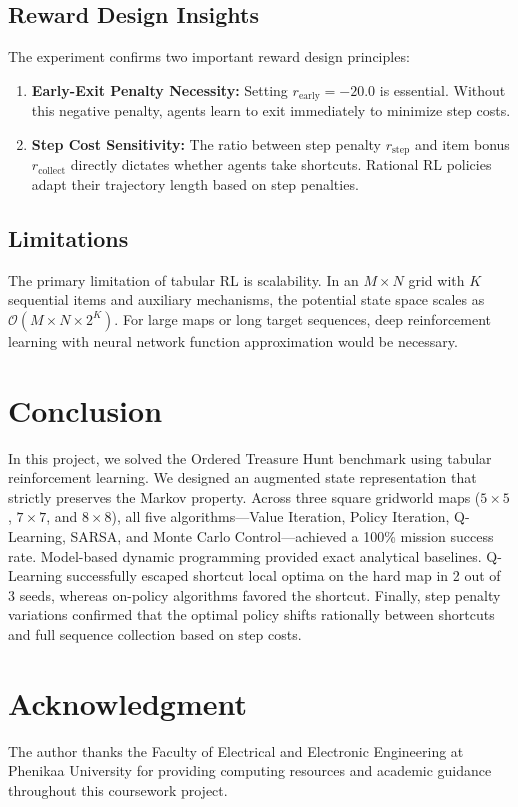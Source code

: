 \documentclass[10pt,conference]{IEEEtran}
\begin{document}
\subsection{Reward Design Insights}
The experiment confirms two important reward design principles:
\begin{enumerate}
    \item \textbf{Early-Exit Penalty Necessity:} Setting $r_{\text{early}} = -20.0$ is essential. Without this negative penalty, agents learn to exit immediately to minimize step costs.
    \item \textbf{Step Cost Sensitivity:} The ratio between step penalty $r_{\text{step}}$ and item bonus $r_{\text{collect}}$ directly dictates whether agents take shortcuts. Rational RL policies adapt their trajectory length based on step penalties.
\end{enumerate}

\subsection{Limitations}
The primary limitation of tabular RL is scalability. In an $M \times N$ grid with $K$ sequential items and auxiliary mechanisms, the potential state space scales as $\mathcal{O}(M \times N \times 2^K)$. For large maps or long target sequences, deep reinforcement learning with neural network function approximation would be necessary.

\section{Conclusion}
In this project, we solved the Ordered Treasure Hunt benchmark using tabular reinforcement learning. We designed an augmented state representation that strictly preserves the Markov property. Across three square gridworld maps ($5\times 5$, $7\times 7$, and $8\times 8$), all five algorithms---Value Iteration, Policy Iteration, Q-Learning, SARSA, and Monte Carlo Control---achieved a 100\% mission success rate. Model-based dynamic programming provided exact analytical baselines. Q-Learning successfully escaped shortcut local optima on the hard map in 2 out of 3 seeds, whereas on-policy algorithms favored the shortcut. Finally, step penalty variations confirmed that the optimal policy shifts rationally between shortcuts and full sequence collection based on step costs.

\section*{Acknowledgment}
The author thanks the Faculty of Electrical and Electronic Engineering at Phenikaa University for providing computing resources and academic guidance throughout this coursework project.
\end{document}
